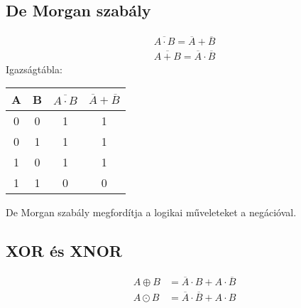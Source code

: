 \documentclass{article}
\begin{document}
\subsection{De Morgan szabály}
\begin{align*}
    \overline{A \cdot B} = \overline{A} + \overline{B} \\
    \overline{A + B} = \overline{A} \cdot \overline{B}
\end{align*}
Igazságtábla:
\begin{table}[ht]
    \begin{tabular}{|c|c|c|c|}
        \hline
        \textbf{A} & \textbf{B} & \textbf{\(\overline{A \cdot B}\)} & \textbf{\(\overline{A} + \overline{B}\)} \\
        \hline
        0          & 0          & 1                                 & 1                                        \\
        \hline
        0          & 1          & 1                                 & 1                                        \\
        \hline
        1          & 0          & 1                                 & 1                                        \\
        \hline
        1          & 1          & 0                                 & 0                                        \\
        \hline
    \end{tabular}
\end{table}
\newline
De Morgan szabály megfordítja a logikai műveleteket a negációval.

\subsection{XOR és XNOR}
\begin{align*}
    A \oplus B & = \overline{A} \cdot B + A \cdot \overline{B} \\
    A \odot B  & = \overline{A} \cdot \overline{B} + A \cdot B
\end{align*}
\end{document}
